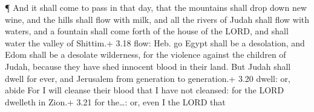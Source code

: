 ¶ And it shall come to pass in that day, that the
mountains shall drop down new wine, and the hills shall flow with milk,
and all the rivers of Judah shall flow with waters, and a fountain shall
come forth of the house of the LORD, and shall water the valley of
Shittim.+ 3.18 flow: Heb. go  Egypt shall be a desolation,
and Edom shall be a desolate wilderness, for the violence against the
children of Judah, because they have shed innocent blood in their land.
 But Judah shall dwell for ever, and Jerusalem from
generation to generation.+ 3.20 dwell: or, abide  For I
will cleanse their blood that I have not cleansed: for the LORD dwelleth
in Zion.+ 3.21 for the\ldots: or, even I the LORD that

